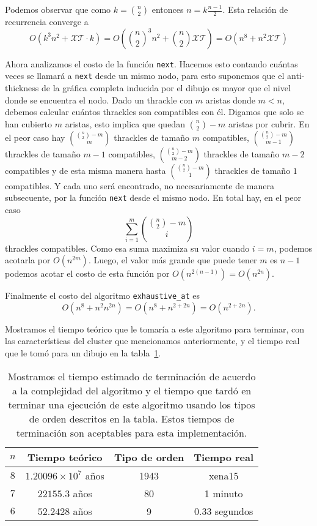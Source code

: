   Podemos observar que como $k=\binom{n}{2}$ entonces $n = k\frac{n-1}{2}$. Esta relación de recurrencia converge a \[ O(k^3 n^2 + \mathcal{XT}\cdot k) = O\left(\binom{n}{2}^3 n^2 + \binom{n}{2}\mathcal{XT}\right) = O(n^8 + n^2\mathcal{XT})\]

  Ahora analizamos el costo de la función \texttt{next}. Hacemos esto contando cuántas veces se llamará a
  \texttt{next} desde un mismo nodo, para esto suponemos que el anti-thickness de la gráfica completa
  inducida por el dibujo es mayor que el nivel donde se encuentra el nodo. Dado un thrackle con $m$ aristas
  donde $m < n$, debemos calcular cuántos thrackles son compatibles con él. Digamos que solo se han
  cubierto $m$ aristas, esto implica que quedan $\binom{n}{2} - m$ aristas por cubrir. En el peor caso hay
  $\binom{\binom{n}{2}-m}{m}$ thrackles de tamaño $m$ compatibles, $\binom{\binom{n}{2}-m}{m-1}$ thrackles
  de tamaño $m-1$ compatibles, $\binom{\binom{n}{2}-m}{m-2}$ thrackles de tamaño $m-2$ compatibles y de
  esta misma manera hasta $\binom{\binom{n}{2}-m}{1}$ thrackles de tamaño $1$ compatibles. Y cada uno será
  encontrado, no necesariamente de manera subsecuente, por la función \texttt{next} desde el mismo nodo. En
  total hay, en el peor caso \[ \sum_{i=1}^m \binom{\binom{n}{2}-m}{i} \] thrackles compatibles. Como esa
  suma maximiza su valor cuando $i=m$, podemos acotarla por $O(n^{2m})$. Luego, el valor más grande que
  puede tener $m$ es $n-1$ podemos acotar el costo de esta función por $O(n^{2(n-1)}) = O(n^{2n})$.

  Finalmente el costo del algoritmo \texttt{exhaustive\_at} es
  \[O(n^8 + n^2 n^{2n}) = O(n^8 + n^{2+2n}) = O (n^{2+2n}).\]

  Mostramos el tiempo teórico que le tomaría a este algoritmo para terminar, con las características del cluster que mencionamos anteriormente, y el tiempo real que le tomó para un dibujo en la tabla~\ref{tabla_tiempo_exhaustive_at}.

  \begin{table}
    \centering
    \begin{tabular}{|c|c|c|c|}
      \hline
      $n$ & Tiempo teórico            & Tipo de orden & Tiempo real   \\ \hline
      $8$ & $1.20096\times10^7$ años  & 1943          & xena15             \\ \hline
      $7$ & $22155.3$ años            & 80            & 1 minuto            \\ \hline
      $6$ & $52.2428$ años            & 9             & 0.33 segundos          \\ \hline
    \end{tabular}
    \caption{Mostramos el tiempo estimado de terminación de acuerdo a la complejidad del algoritmo y el tiempo que tardó en terminar una ejecución de este algoritmo usando los tipos de orden descritos en la tabla. Estos tiempos de terminación son aceptables para esta implementación.}
    \label{tabla_tiempo_exhaustive_at}

  \end{table}

